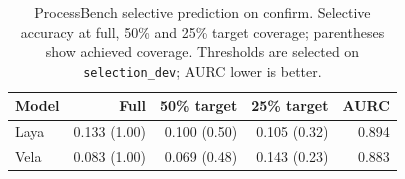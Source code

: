 \begin{table}[t]
\centering
\small
\caption{ProcessBench selective prediction on confirm. Selective accuracy at
full, 50\% and 25\% target coverage; parentheses show achieved coverage.
Thresholds are selected on \texttt{selection\_dev}; AURC lower is better.}
\label{tab:processbench}
\begin{tabular}{@{}lrrrr@{}}
\toprule
Model & Full & 50\% target & 25\% target & AURC \\
\midrule
Laya & 0.133 (1.00) & 0.100 (0.50) & 0.105 (0.32) & 0.894 \\
Vela & 0.083 (1.00) & 0.069 (0.48) & 0.143 (0.23) & 0.883 \\
\bottomrule
\end{tabular}
\end{table}
